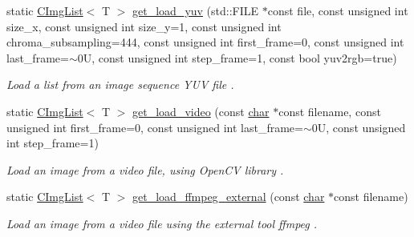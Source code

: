\begin{DoxyCompactItemize}
\mbox{\label{structcimg__library__suffixed_1_1CImgList_aa9f098546a392521aee857e2a9732e8d}} 
static \hyperlink{structcimg__library__suffixed_1_1CImgList}{C\+Img\+List}$<$ T $>$ \hyperlink{structcimg__library__suffixed_1_1CImgList_aa9f098546a392521aee857e2a9732e8d}{get\+\_\+load\+\_\+yuv} (std\+::\+F\+I\+LE $\ast$const file, const unsigned int size\+\_\+x, const unsigned int size\+\_\+y=1, const unsigned int chroma\+\_\+subsampling=444, const unsigned int first\+\_\+frame=0, const unsigned int last\+\_\+frame=$\sim$0\+U, const unsigned int step\+\_\+frame=1, const bool yuv2rgb=true)
\begin{DoxyCompactList}\small\item\em Load a list from an image sequence Y\+UV file . \end{DoxyCompactList}\item 
\mbox{\label{structcimg__library__suffixed_1_1CImgList_aa534cd50892cb314039eb59eb5b66824}} 
static \hyperlink{structcimg__library__suffixed_1_1CImgList}{C\+Img\+List}$<$ T $>$ \hyperlink{structcimg__library__suffixed_1_1CImgList_aa534cd50892cb314039eb59eb5b66824}{get\+\_\+load\+\_\+video} (const \hyperlink{classchar}{char} $\ast$const filename, const unsigned int first\+\_\+frame=0, const unsigned int last\+\_\+frame=$\sim$0\+U, const unsigned int step\+\_\+frame=1)
\begin{DoxyCompactList}\small\item\em Load an image from a video file, using Open\+CV library . \end{DoxyCompactList}\item 
\mbox{\label{structcimg__library__suffixed_1_1CImgList_a9bdbb375959e220d994049785c42e9e1}} 
static \hyperlink{structcimg__library__suffixed_1_1CImgList}{C\+Img\+List}$<$ T $>$ \hyperlink{structcimg__library__suffixed_1_1CImgList_a9bdbb375959e220d994049785c42e9e1}{get\+\_\+load\+\_\+ffmpeg\+\_\+external} (const \hyperlink{classchar}{char} $\ast$const filename)
\begin{DoxyCompactList}\small\item\em Load an image from a video file using the external tool \textquotesingle{}ffmpeg\textquotesingle{} . \end{DoxyCompactList}\item 
\mbox{\label{structcimg__library__suffixed_1_1CImgList_a74ba3fead6216d5b931e19f485386701}} 

\end{DoxyCompactItemize}
